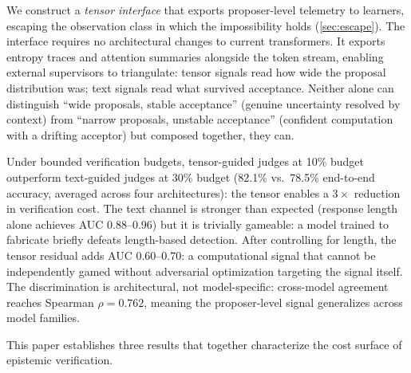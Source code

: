 We construct a \emph{tensor interface} that exports proposer-level telemetry to
learners, escaping the observation class in which the impossibility holds
(\autoref{sec:escape}). The interface requires no architectural changes to
current transformers. It exports entropy traces and attention summaries alongside
the token stream, enabling external supervisors to triangulate: tensor signals
read how wide the proposal distribution was; text signals read what survived
acceptance. Neither alone can distinguish ``wide proposals, stable acceptance''
(genuine uncertainty resolved by context) from ``narrow proposals, unstable
acceptance'' (confident computation with a drifting acceptor) but composed
together, they can.

Under bounded verification budgets, tensor-guided judges at 10\% budget
outperform text-guided judges at 30\% budget (82.1\% vs.\ 78.5\% end-to-end
accuracy, averaged across four architectures): the tensor enables a $3\times$
reduction in verification cost. The text channel is stronger than
expected (response length alone achieves AUC 0.88--0.96) but it is trivially
gameable: a model trained to fabricate briefly defeats length-based detection.
After controlling for length, the tensor residual adds AUC 0.60--0.70: a
computational signal that cannot be independently gamed without adversarial
optimization targeting the signal itself. The discrimination is architectural,
not model-specific: cross-model agreement reaches Spearman $\rho = 0.762$,
meaning the proposer-level signal generalizes across model families.

This paper establishes three results that together characterize the cost surface
of epistemic verification.


